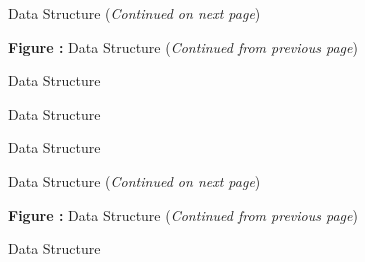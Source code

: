 \clearpage
\begin{figure}[!htp]
\centering
\resizebox{\linewidth}{!}{}
\caption[ Data Structure]{ Data Structure (\textit{Continued on next page})}
\label{f:BC}
\end{figure}
\clearpage
\begin{figure}[!htp]
\centering
\resizebox{\linewidth}{!}{}
\par\vspace{\abovecaptionskip}
\textbf{Figure :}  Data Structure (\textit{Continued from previous page})
\end{figure}

\clearpage
\begin{figure}[!htp]
\centering

\caption{ Data Structure}
\label{f:BCData}
\end{figure}

\clearpage
\begin{figure}[!htp]
\centering
%
\resizebox{!}{\textheight-2\baselineskip}{}
\caption{ Data Structure}
\label{f:BCDataSet}
\end{figure}

\clearpage
\begin{figure}[!htp]
\centering

\caption{ Data Structure}
\label{f:BCProperty}
\end{figure}

\clearpage
\begin{figure}[!htp]
\centering
\resizebox{\linewidth}{!}{}
\caption[ Data Structure]{ Data Structure (\textit{Continued on next page})}
\label{f:CGNSBase}
\end{figure}
\clearpage
\begin{figure}[!htp]
\centering
\resizebox{\linewidth}{!}{}
\par\vspace{\abovecaptionskip}
\textbf{Figure :}  Data Structure (\textit{Continued from previous page})
\end{figure}

\clearpage
\begin{figure}[!htp]
\centering

\caption{ Data Structure}
\label{f:ChemicalKineticsModel}
\end{figure}

